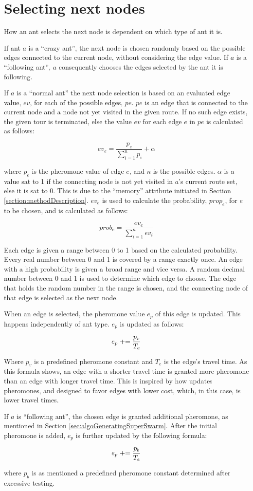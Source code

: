 \section{Selecting next nodes}
\label{sec:selectingNextNode}

How an ant selects the next node is dependent on which type of ant it is. 

If ant $a$ is a ``crazy ant'', the next node is chosen randomly based on the possible edges connected to the current node, without considering the edge value. If $a$ is a ``following ant'', $a$ consequently chooses the edges selected by the ant it is following.  

If $a$ is a ``normal ant'' the next node selection is based on an evaluated edge value, $ev$, for each of the possible edges, $pe$. $pe$ is an edge that is connected to the current node and a node not yet visited in the given route. If no such edge exists, the given tour is terminated, else the value $ev$ for each edge $e$ in $pe$ is calculated as follows: 

$$ev_e = \frac{p_e}{\sum\limits^{n}_{i=1}p_i} + \alpha $$

where $p_e$ is the pheromone value of edge $e$, and $n$ is the possible edges. $\alpha$ is a value sat to 1 if the connecting node is not yet visited in $a$'s current route set, else it is sat to 0. This is due to the ``memory'' attribute initiated in Section \vref{section:methodDescription}. $ev_e$ is used to calculate the probability, $prop_e$, for $e$ to be chosen, and is calculated as follows:

$$prob_e = \frac{ev_e}{\sum\limits^{n}_{i=1}ev_i}$$

Each edge is given a range between 0 to 1 based on the calculated probability. Every real number between 0 and 1 is covered by a range exactly once. An edge with a high probability is given a broad range and vice versa. A random decimal number between 0 and 1 is used to determine which edge to choose. The edge that holds the random number in the range is chosen, and the connecting node of that edge is selected as the next node. 

When an edge is selected, the pheromone value $e_p$ of this edge is updated. This happens independently of ant type. $e_p$ is updated as follows:

$$e_p \mathrel{+}= \frac{p_v}{T_e}$$ 

Where $p_v$ is a predefined pheromone constant and $T_e$ is the edge's travel time. As this formula shows, an edge with a shorter travel time is granted more pheromone than an edge with longer travel time. This is inspired by how \citet{hsiao04} updates pheromones, and designed to favor edges with lower cost, which, in this case, is lower travel times. 

If $a$ is ``following ant'', the chosen edge is granted additional pheromone, as mentioned in Section \vref{sec:algoGeneratingSuperSwarm}. After the initial pheromone is added, $e_p$ is further updated by the following formula:

$$e_p \mathrel{+}= \frac{p_b}{T_e}$$ 

where $p_b$ is as mentioned a predefined pheromone constant determined after excessive testing.
